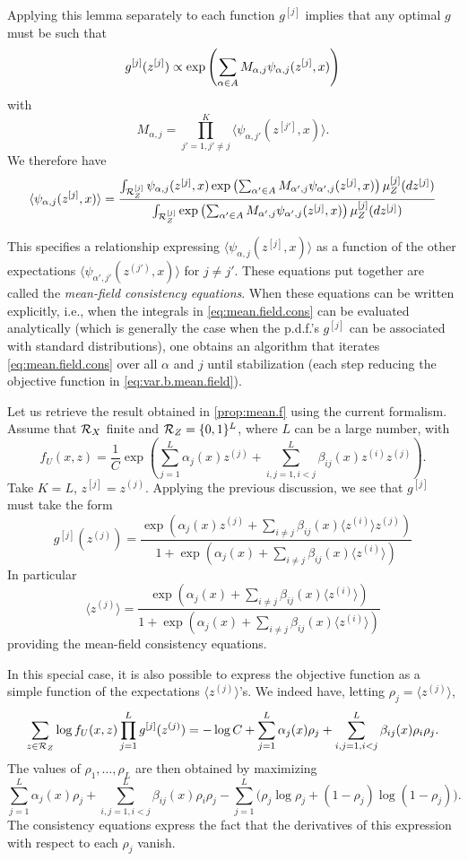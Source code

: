 Applying this lemma separately to each function $g^{[j]}$ implies that any optimal $g$ must be such that
\[
g^{[j]}(z^{[j]}) \propto \exp\left(\sum_{\alpha\in A} M_{\alpha,j}\psi_{\alpha,j}(z^{[j]}, x)\right)
\]
with
\[
M_{\alpha,j} = \prod_{j'=1, j'\neq j}^K \langle \psi_{\alpha,j'}(z^{[j']}, x) \rangle.
\]
We therefore have
\begin{equation}
\label{eq:mean.field.cons}
\langle \psi_{\alpha,j}(z^{[j]}, x) \rangle = \frac{\int_{{\mathcal R}_Z^{[j]}} \psi_{\alpha,j}(z^{[j]}, x) \exp\left(\sum_{\alpha'\in A} M_{\alpha',j}\psi_{\alpha',j}(z^{[j]}, x)\right) \mu_Z^{[j]}(dz^{[j]})}{\int_{{\mathcal R}_Z^{[j]}} \exp\left(\sum_{\alpha'\in A} M_{\alpha',j}\psi_{\alpha',j}(z^{[j]}, x)\right) \mu_Z^{[j]}(dz^{[j]})}
\end{equation}

This specifies a relationship expressing $\langle \psi_{\alpha,j}(z^{[j]}, x) \rangle$ as a function of the other expectations $\langle \psi_{\alpha',j'}(z^{(j')}, x) \rangle$ for $j\neq j'$. These equations put together are called the {\em mean-field consistency equations}. When these equations can be written explicitly, i.e., when the integrals in \cref{eq:mean.field.cons} can be evaluated analytically (which is generally the case when the p.d.f.'s $g^{[j]}$ can be associated with standard distributions), one obtains an algorithm that iterates \cref{eq:mean.field.cons} over all $\alpha$ and $j$ until stabilization (each step reducing the objective function in \cref{eq:var.b.mean.field}).




Let us retrieve the result obtained in \cref{prop:mean.f} using the current formalism. Assume that  ${\mathcal R}_X$ finite and ${\mathcal R}_Z = \{0,1\}^L$, where $L$ can be a large number, with
\[
f_U(x, z) = \frac1C \exp\left( \sum_{j=1}^L \alpha_j(x) z^{(j)} + \sum_{i,j=1, i<j}^L \beta_{ij}(x) z^{(i)} z^{(j)}\right).
\]
Take $K=L$, $z^{[j]} = z^{(j)}$. Applying the previous discussion, we see that $g^{[j]}$ must take the form
\[
g^{[j]}(z^{(j)}) = \frac{\exp\left(\alpha_j(x) z^{(j)}  + \sum_{i\neq j}\beta_{ij}(x) \langle z^{(i)} \rangle z^{(j)}\right) }{1 + \exp\left(\alpha_j(x)   + \sum_{i\neq j}\beta_{ij}(x) \langle z^{(i)} \rangle\right)}
\]
In particular
\[
\langle z^{(j)} \rangle =  \frac{\exp\left(\alpha_j(x)  + \sum_{i\neq j}\beta_{ij}(x) \langle z^{(i)} \rangle \right) }{1 + \exp\left(\alpha_j(x)  + \sum_{i\neq j}\beta_{ij}(x) \langle z^{(i)} \rangle\right)}
\]
providing the mean-field consistency equations. 

In this special case, it is also possible to express the objective function as a simple function of the expectations $\langle z^{(j)}\rangle$'s. We indeed have, letting $\rho_j = \langle z^{(j)}\rangle$,
\[
\sum_{z\in {\mathcal R}_Z} \log f_U(x,z) \prod_{j=1}^L g^{[j]}(z^{(j)})  =
-\log C + \sum_{j=1}^L \alpha_j(x) \rho_j + \sum_{i,j=1, i<j}^L \beta_{ij}(x) \rho_i\rho_j.
\]
The values of $\rho_1, \ldots, \rho_L$ are then obtained  by maximizing
\[
\sum_{j=1}^L \alpha_j(x) \rho_j + \sum_{i,j=1, i<j}^L \beta_{ij}(x) \rho_i\rho_j - \sum_{j=1}^L \big(\rho_j\log\rho_j + (1-\rho_j)\log(1-\rho_j)\big).
\]
The consistency equations express the fact that the derivatives of this expression with respect to each $\rho_j$ vanish.


